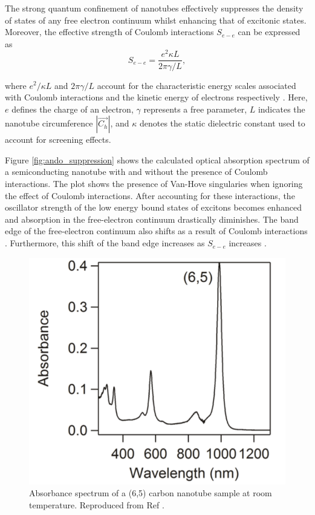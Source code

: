The strong quantum confinement of nanotubes effectively suppresses the density of states of any free electron continuum whilst enhancing that of excitonic states. Moreover, the effective strength of Coulomb interactions $S_{e-e}$ can be expressed as 
\begin{equation}
	S_{e-e} = \dfrac{e^2 \kappa L}{2 \pi \gamma/L},
\end{equation}

where $e^2 /\kappa L$ and $2 \pi \gamma / L$ account for the characteristic energy scales associated with Coulomb interactions and the kinetic energy of electrons respectively \cite{ando2005theory}. Here, $e$ defines the charge of an electron, $\gamma$ represents a free parameter, $L$ indicates the nanotube circumference $|\vec{C_h}|$, and $\kappa$ denotes the static dielectric constant used to account for screening effects.

Figure \ref{fig:ando_suppression} shows the calculated optical absorption spectrum of a semiconducting nanotube with and without the presence of Coulomb interactions. The plot shows the presence of Van-Hove singularies when ignoring the effect of Coulomb interactions. After accounting for these interactions, the oscillator strength of the low energy bound states of excitons becomes enhanced and absorption in the free-electron continuum drastically diminishes. The band edge of the free-electron continuum also shifts as a result of Coulomb interactions \cite{ando1997excitons}. Furthermore, this shift of the band edge increases as $S_{e-e}$ increases \cite{ando2005theory}. 

\begin{figure}[h]
	\centering
	\includegraphics[scale=0.62]{images/chapter_optical_props/cnt_absorbance_yota}
	\caption{Absorbance spectrum of a (6,5) carbon nanotube sample at room temperature. Reproduced from Ref \cite{ichinose2017extraction}. }
	\label{fig:cnt_abs_yota}
\end{figure}

